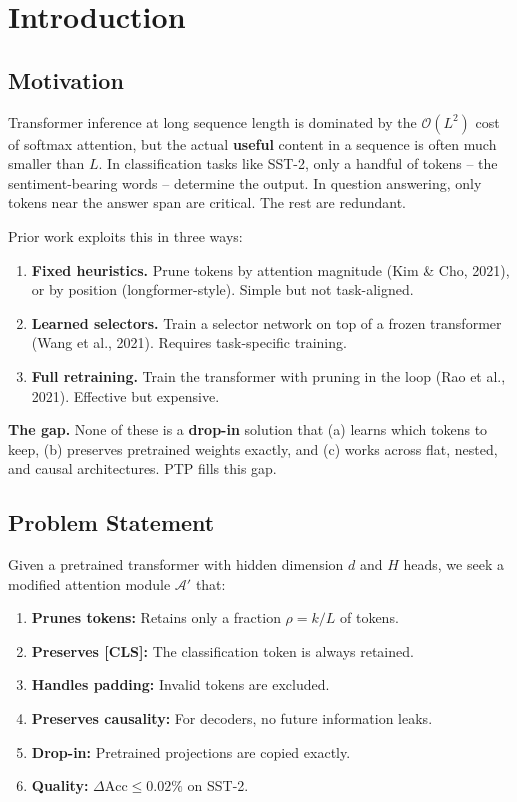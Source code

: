 
\section{Introduction}

\subsection{Motivation}

Transformer inference at long sequence length is dominated by the 
$\mathcal{O}(L^2)$ cost of softmax attention, but the actual \textbf{useful} 
content in a sequence is often much smaller than $L$. In classification 
tasks like SST-2, only a handful of tokens -- the sentiment-bearing words -- 
determine the output. In question answering, only tokens near the answer 
span are critical. The rest are redundant.

Prior work exploits this in three ways:

\begin{enumerate}
\item \textbf{Fixed heuristics.} Prune tokens by attention magnitude (Kim \& Cho,
  2021), or by position (longformer-style). Simple but not task-aligned.

\item \textbf{Learned selectors.} Train a selector network on top of a frozen
  transformer (Wang et al., 2021). Requires task-specific training.

\item \textbf{Full retraining.} Train the transformer with pruning in the loop
  (Rao et al., 2021). Effective but expensive.

\end{enumerate}
\textbf{The gap.} None of these is a \textbf{drop-in} solution that (a) learns which 
tokens to keep, (b) preserves pretrained weights exactly, and (c) works 
across flat, nested, and causal architectures. PTP fills this gap.

\subsection{Problem Statement}

Given a pretrained transformer with hidden dimension $d$ and $H$ heads, we 
seek a modified attention module $\mathcal{A}'$ that:

\begin{enumerate}
\item \textbf{Prunes tokens:} Retains only a fraction $\rho = k/L$ of tokens.
\item \textbf{Preserves [CLS]:} The classification token is always retained.
\item \textbf{Handles padding:} Invalid tokens are excluded.
\item \textbf{Preserves causality:} For decoders, no future information leaks.
\item \textbf{Drop-in:} Pretrained projections are copied exactly.
\item \textbf{Quality:} $\Delta\text{Acc} \leq 0.02\%$ on SST-2.

\end{enumerate}
